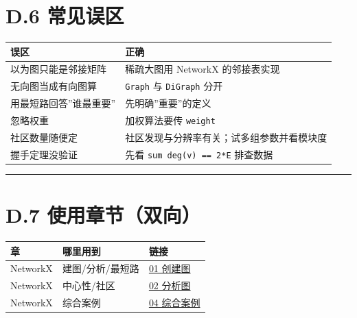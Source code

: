 \section{D.6 常见误区}\label{d.6-ux5e38ux89c1ux8befux533a}

{\def\LTcaptype{none} %
\begin{longtable}[]{@{}ll@{}}
\toprule\noalign{}
误区 & 正确 \\
\midrule\noalign{}
\endhead
\bottomrule\noalign{}
\endlastfoot
以为图只能是邻接矩阵 & 稀疏大图用 NetworkX 的邻接表实现 \\
无向图当成有向图算 & \texttt{Graph} 与 \texttt{DiGraph} 分开 \\
用最短路回答''谁最重要'' & 先明确''重要''的定义 \\
忽略权重 & 加权算法要传 \texttt{weight} \\
社区数量随便定 & 社区发现与分辨率有关；试多组参数并看模块度 \\
握手定理没验证 & 先看 \texttt{sum\ deg(v)\ ==\ 2*\textbar{}E\textbar{}}
排查数据 \\
\end{longtable}
}

\begin{center}\rule{0.5\linewidth}{0.5pt}\end{center}

\section{D.7
使用章节（双向）}\label{d.7-ux4f7fux7528ux7ae0ux8282ux53ccux5411}

{\def\LTcaptype{none} %
\begin{longtable}[]{@{}
  >{\raggedright\arraybackslash}p{}
  >{\raggedright\arraybackslash}p{}
  >{\raggedright\arraybackslash}p{}@{}}
\toprule\noalign{}
\begin{minipage}[b]{\linewidth}\raggedright
章
\end{minipage} & \begin{minipage}[b]{\linewidth}\raggedright
哪里用到
\end{minipage} & \begin{minipage}[b]{\linewidth}\raggedright
链接
\end{minipage} \\
\midrule\noalign{}
\endhead
\bottomrule\noalign{}
\endlastfoot
6 NetworkX & 建图/分析/最短路 &
\href{../../chapters/06-networkx/01-创建图.md}{01 创建图} \\
6 NetworkX & 中心性/社区 &
\href{../../chapters/06-networkx/02-分析图.md}{02 分析图} \\
6 NetworkX & 综合案例 &
\href{../../chapters/06-networkx/04-综合案例.md}{04 综合案例} \\
\end{longtable}
}

